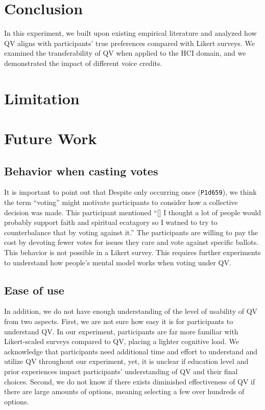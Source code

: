 \section{Conclusion} \label{conclusion}
In this experiment, we built upon existing empirical literature
and analyzed how QV aligns with participants' true preferences compared with Likert surveys.
We examined the transferability of QV when applied to the HCI domain, and we demonstrated the impact of different voice credits.


\section{Limitation}

\section{Future Work} \label{future}

\subsection{Behavior when casting votes} %
It is important to point out that Despite only occurring once (\texttt{P1d659}), we think the term ``voting'' might motivate participants to consider how a collective decision was made.
This participant mentioned ``[\textellipsis] I thought a lot of people would probably support faith and spiritual ecatagory  so I watned to try to counterbalance that by voting against it.'' The participants are willing to pay the cost by devoting fewer votes for issues they care and vote against specific ballots. This behavior is not possible in a Likert survey. This requires further experiments to understand how people's mental model works when voting under QV. \par 

\subsection{Ease of use}
In addition, we do not have enough understanding of the level of usability of QV from two aspects.
First, we are not sure how easy it is for participants to understand QV.
In our experiment, participants are far more familiar with Likert-scaled surveys compared to QV, placing a lighter cognitive load.
We acknowledge that participants need additional time and effort to understand and utilize QV throughout our experiment, yet, it is unclear if education level and prior experiences impact participants' understanding of QV and their final choices.
Second, we do not know if there exists diminished effectiveness of QV if there are large amounts of options, meaning selecting a few over hundreds of options.

